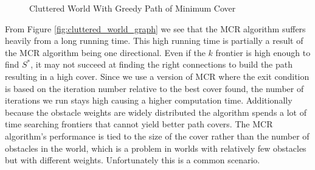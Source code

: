 \begin{figure}[!h]
    \hfill
    \caption{Cluttered World With Greedy Path of Minimum Cover}
    \label{fig:cluttered_world}
\end{figure}



From Figure \ref{fig:cluttered_world_graph} we see that the MCR algorithm suffers heavily from a long running time. This high running time is partially a result of the MCR algorithm being one directional. Even if the $k$ frontier is high enough to find $S^*$, it may not succeed at finding the right connections to build the path resulting in a high cover. Since we use a version of MCR where the exit condition is based on the iteration number relative to the best cover found, the number of iterations we run stays high causing a higher computation time. Additionally because the obstacle weights are widely distributed the algorithm spends a lot of time searching frontiers that cannot yield better path covers. The MCR algorithm's performance is tied to the size of the cover rather than the number of obstacles in the world, which is a problem in worlds with relatively few obstacles but with different weights. Unfortunately this is a common scenario.

